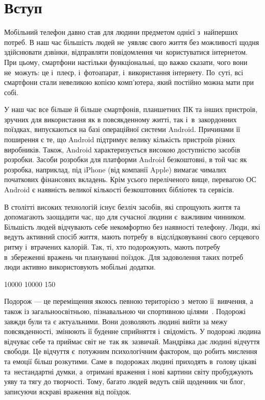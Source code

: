 \documentclass[../main.tex]{subfiles}
\begin{document}
\chapter*{Вступ}

Мобільний телефон давно став для людини предметом однієї з~найперших потреб. В наш час більшість людей не~уявляє свого життя без можливості щодня здійснювати дзвінки, відправляти повідомлення чи~користуватися інтернетом. При цьому, смартфони настільки функціональні, що важко сказати, чого вони не~можуть: це і~плеєр, і~фотоапарат, і~використання інтернету. По~суті, всі смартфони стали невеликою копією комп'ютера, який постійно можна мати при собі.

У наш час все більше й більше смартфонів, планшетних ПК та інших пристроїв, зручних для використання як в повсякденному житті, так і~в~закордонних поїздках, випускаються на базі операційної системи Android. Причинами її поширення є те, що Android підтримує велику кількість пристроїв різних виробників. Також, Android характеризується високою доступністю засобів розробки. Засоби розробки для платформи Android безкоштовні, в той час як розробка, наприклад, під iPhone (від компанії Apple) вимагає чималих початкових фінансових вкладень. Крім усього переліченого вище, перевагою ОС Android є наявність великої кількості безкоштовних бібліотек та сервісів.

В столітті високих технологій існує безліч засобів, які спрощують життя та допомагають заощадити час, що для сучасної людини є~важливим чинником. Більшість людей відчувають себе некомфортно без наявності телефону. Люди, які ведуть активний спосіб життя, мають потребу в~відслідковуванні свого серцевого ритму і~втрачених калорій. Так, ті, хто подорожують, мають потребу в~збереженні вражень чи плануванні поїздок. Для задоволення таких потреб люди активно використовують мобільні додатки.

{
 10000 10000 150	

Подорож — це переміщення якоюсь певною територією з~метою її~вивчення, а також із загальноосвітньою, пізнавальною чи спортивною цілями~\cite{travel}. Подорожі завжди були та є актуальними. Вони дозволяють людині вийти за межу повсякденності, змінюють її буденне сприйняття і~свідомість. У подорожі людина відчуває себе та приймає світ не~так як~зазвичай. Мандрівка дає людині відчуття свободи. Це відчуття є~потужним психологічним фактором, що робить мислення та емоції більш розкутими. Саме в~подорожах людині приходять в~голову цікаві та~нестандартні думки, а~отримані враження і нові картини світу пробуджують уяву та тягу до творчості. Тому, багато людей ведуть свій щоденник чи блог, записуючи яскраві враження від поїздок.
	
}
\end{document}
